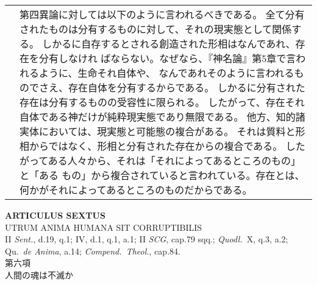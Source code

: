 \documentclass[paper=a4paper,fontsize=10pt,jafontsize=9pt,titlepage]{jlreq}
\begin{document}
\begin{longtable}{p{21em}p{21em}}
&

第四異論に対しては以下のように言われるべきである。
全て分有されたものは分有するものに対して、それの現実態として関係する。
しかるに自存するとされる創造された形相はなんであれ、存在を分有しなけれ
 ばならない。なぜなら、『神名論』第5章で言われるように、生命それ自体や、
 なんであれそのように言われるものでさえ、存在自体を分有するからである。
しかるに分有された存在は分有するものの受容性に限られる。
したがって、存在それ自体である神だけが純粋現実態であり無限である。
他方、知的諸実体においては、現実態と可能態の複合がある。
それは質料と形相からではなく、形相と分有された存在からの複合である。
したがってある人々から、それは「それによってあるところのもの」と「ある
もの」から複合されていると言われている。存在とは、何かがそれによってあるところのものだからである。

\end{longtable}
\newpage




\begin{center}
{\Large {\bfseries ARTICULUS SEXTUS}}\\
{\large UTRUM ANIMA HUMANA SIT CORRUPTIBILIS}\\
{\footnotesize II {\itshape Sent.}, d.19, q.1; IV, d.1, q.1, a.1;
 II {\itshape SCG}, cap.79 sqq.; {\itshape Quodl.}~X, q.3, a.2;
 Qu.~{\itshape de Anima}, a.14; {\itshape Compend.~Theol.}, cap.84.}\\
{\Large 第六項\\人間の魂は不滅か}
\end{center}
\end{document}
